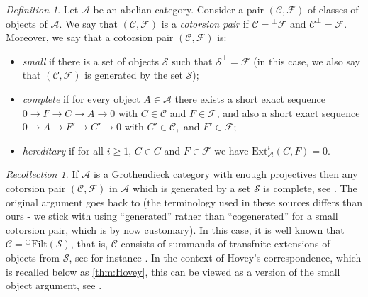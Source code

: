 \documentclass{amsart}
\def \A{{\mathcal A}}
\def \C{{\mathcal C}}
\def \F{{\mathcal F}}
\def \S{{\mathcal S}}
\numberwithin{equation}{section}%
\theoremstyle{remark}
\newtheorem{definition}[equation]{Definition}
\newtheorem{recollection}[equation]{Recollection}
\begin{document}
\begin{definition}
    Let $\A$ be an abelian category. Consider a  pair $(\C,\F)$ of classes of objects of $\A$. We say that $(\C,\F)$ is a \textit{cotorsion pair} if $\C={}^\perp\F$ and $\C^\perp=\F$. Moreover, we say that a cotorsion pair $(\C,\F)$ is:
    \begin{itemize}
        \item \textit{small} if there is a set of objects $\S$ such that $\S^\perp=\F$ (in this case, we also say that $(\C,\F)$ is generated by the set $\S$);
        \item \textit{complete} if for every object $A\in\A$ there exists a short exact sequence $0\rightarrow F\rightarrow C\rightarrow A\rightarrow 0$ with $C\in\C$ and $F\in\F$, and also a short exact sequence $0\rightarrow A\rightarrow F'\rightarrow C'\rightarrow 0$ with $C'\in\C,$ and $F'\in\F$;
        \item \textit{hereditary} if for all $i\geqslant 1,\,  C\in C$ and $F\in\F$ we have $\mathrm{Ext}_{\A}^i(C,F)=0.$
    \end{itemize}
\end{definition}


\begin{recollection}
\label{rem:complete}
If $\A$ is a Grothendieck category with enough projectives then any cotorsion pair $(\mathcal{C,\mathcal{F}})$ in $\mathcal{A}$ which is generated by a set $\mathcal{S}$ is complete, see \cite[Corollary~6.6]{Hov02}. The original argument goes back to \cite[Theorem~10]{Eklof} (the terminology used in these sources differs than ours - we stick with using ``generated'' rather than ``cogenerated'' for a small cotorsion pair, which is by now customary). In this case, it is well known that $\mathcal{C}={}^{\oplus}\mathrm{Filt}(\mathcal{S})$, that is, $\C$ consists of summands of transfnite extensions of objects from $\mathcal{S}$, see for instance \cite[Corollary~6.9]{Hov02}. 
In the context of Hovey's correspondence, which is recalled below as  \cref{thm:Hovey}, this can be viewed as a version of the small object argument, see \cite{Jan-Man}.
\end{recollection}
\end{document}
